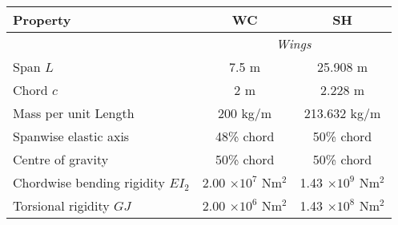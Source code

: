 \documentclass{standalone}
\begin{document}
    \centering
    \begin{tabular}{l c c}
    \toprule
    \toprule
    Property&WC&SH\\
    \midrule
    &\multicolumn{2}{c}{\textit{Wings}}\\
    Span $L$     & 7.5 m  & 25.908 m  \\
    Chord $c$   & 2 m & 2.228 m \\
    Mass per unit Length     & 200 kg/m & 213.632 kg/m\\
    Spanwise elastic axis   & 48\% chord & 50\% chord\\
    Centre of gravity   & 50\% chord& 50\% chord\\
    Chordwise bending rigidity $EI_2$   & 2.00 $\times 10^7$ Nm$^2$ & 1.43 $\times 10^9$ Nm$^2$\\
    Torsional rigidity $GJ$ & 2.00 $\times 10^6$ Nm$^2$& 1.43 $\times 10^8$ Nm$^2$\\
    \bottomrule
    \bottomrule
    \end{tabular}
    
\end{document}
